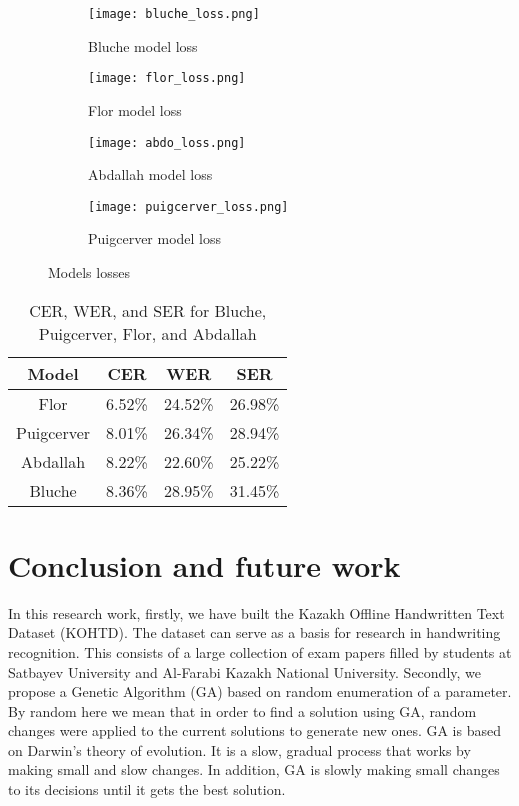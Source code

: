 \documentclass[preprint,12pt]{elsarticle}
\begin{document}
\begin{figure}[h!]
    \begin{subfigure}{0.50\columnwidth}
        \texttt{[image: bluche\_loss.png]}
        \caption{Bluche model loss}
        \label{fig:bluche_loss}
    \end{subfigure}
    \begin{subfigure}{0.50\columnwidth}
        \texttt{[image: flor\_loss.png]}
        \caption{Flor model loss}
        \label{fig:flor_loss}
    \end{subfigure}
    \begin{subfigure}{0.50\columnwidth}
        \texttt{[image: abdo\_loss.png]}
        \caption{Abdallah model loss}
        \label{fig:abdo_loss}
    \end{subfigure}
    \begin{subfigure}{0.50\columnwidth}
        \texttt{[image: puigcerver\_loss.png]}
        \caption{Puigcerver model loss}
        \label{fig:puigcerver_loss}
    \end{subfigure}
\caption{Models losses} 
\label{fig:model_losses}
\end{figure} 




\begin{table}[ht!]
\centering
	\caption{\footnotesize{CER, WER, and SER for Bluche, Puigcerver, Flor, and Abdallah }}
\begin{tabular}{|c|c|c|c|}
    \hline
    Model &   CER & WER & SER   \\
    \hline
    Flor  & 6.52\% & 24.52\%  &  26.98\% \\
    \hline
    Puigcerver  &  8.01\% & 26.34\% &28.94\% \\
    \hline
    Abdallah &  8.22\% & 22.60\%  & 25.22\%   \\
   
    \hline
     Bluche & 8.36\% & 28.95\%  & 31.45\% \\
    \hline

\end{tabular}


\label{tab:Bluche_Puigcerver}
\end{table}

\section{Conclusion and future work}
\label{section:Conclusion}
In this research work, firstly, we have built the Kazakh Offline Handwritten Text Dataset (KOHTD). The dataset can serve as a basis for research in handwriting recognition. This consists of a large collection of exam papers filled by students at Satbayev University and Al-Farabi Kazakh National University. Secondly, we propose a Genetic Algorithm (GA) based on random enumeration of a parameter. By random here we mean that in order to find a solution using GA, random changes were applied to the current solutions to generate new ones. GA is based on Darwin's theory of evolution. It is a slow, gradual process that works by making small and slow changes. In addition, GA is slowly making small changes to its decisions until it gets the best solution.
\end{document}
